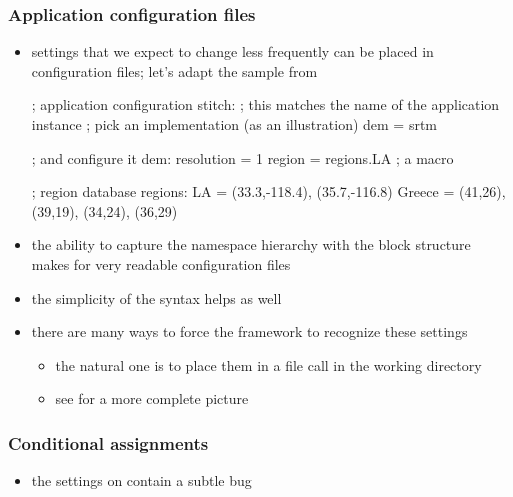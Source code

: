 \begin{frame}[fragile]
%
  \label{frame:applications-config}
%
  \frametitle{Application configuration files}
%
  \begin{itemize}
%
  \item settings that we expect to change less frequently can be placed in configuration files;
    let's adapt the sample from 
%
    \begin{ipfg}[gobble=6]{}
      ; application configuration
      stitch: ; this matches the name of the application instance
         ; pick an implementation (as an illustration)
         dem = srtm

         ; and configure it
         dem:
             resolution = 1
             region = {regions.LA} ; a macro

      ; region database
      regions:
          LA = (33.3,-118.4), (35.7,-116.8)
          Greece = (41,26), (39,19), (34,24), (36,29)
      \end{ipfg}
%
  \item the ability to capture the namespace hierarchy with the block structure makes for very
    readable configuration files
%
  \item the simplicity of the syntax helps as well
%
  \item there are many ways to force the framework to recognize these settings
    \begin{itemize}
    \item the natural one is to place them in a file call  in the working
      directory
    \item see  for a more complete picture
    \end{itemize}
%
  \end{itemize}
%
\end{frame}

\begin{frame}
%
  \label{frame:applications-config-conditional}
%
  \frametitle{Conditional assignments}
%
  \begin{itemize}
%
  \item the settings on  contain a subtle bug
%
  \end{itemize}
%
\end{frame}

